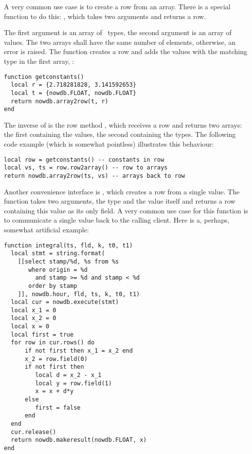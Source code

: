 A very common use case is to create a row from
an array. There is a special function to do this:
, which takes two arguments
and returns a row.

The first argument is an array of \nowdb\ types,
the second argument is an array of values.
The two arrays shall have the same number
of elements, otherwise, an error is raised.
The function creates a row and adds the values
with the matching type in the first array, \eg:

\begin{lua}
\begin{lstlisting}
function getconstants()
  local r = {2.718281828, 3.141592653}
  local t = {nowdb.FLOAT, nowdb.FLOAT}
  return nowdb.array2row(t, r)
end
\end{lstlisting}
\end{lua}

The inverse of  is the row method
, which receives a row and returns
two arrays: the first containing the values,
the second containing the types.
The following code example (which is
somewhat pointless) illustrates this
behaviour:

\begin{lua}
\begin{lstlisting}
local row = getconstants() -- constants in row
local vs, ts = row.row2array() -- row to arrays
return nowdb.array2row(ts, vs) -- arrays back to row
\end{lstlisting}
\end{lua}

Another convenience interface is ,
which creates a row from a single value. The function
takes two arguments, the type and the value itself
and returns a row containing this value as its
only field. A very common use case for this function is
to communicate a single value back to the calling client.
Here is a, perhaps, somewhat artificial example:

\begin{lua}
\begin{lstlisting}
function integral(ts, fld, k, t0, t1)
  local stmt = string.format(
    [[select stamp/%d, %s from %s
       where origin = %d
         and stamp >= %d and stamp < %d
       order by stamp
    ]], nowdb.hour, fld, ts, k, t0, t1)
  local cur = nowdb.execute(stmt)
  local x_1 = 0
  local x_2 = 0
  local x = 0
  local first = true
  for row in cur.rows() do
      if not first then x_1 = x_2 end
      x_2 = row.field(0)
      if not first then
         local d = x_2 - x_1
         local y = row.field(1)
         x = x + d*y
      else
         first = false
      end
  end
  cur.release()
  return nowdb.makeresult(nowdb.FLOAT, x)
end
\end{lstlisting}
\end{lua}

